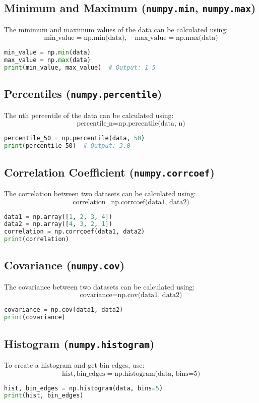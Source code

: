 \documentclass[a4paper, 12pt]{article}
\begin{document}
\subsection{ Minimum and Maximum (\texttt{numpy.min}, \texttt{numpy.max})}
The minimum and maximum values of the data can be calculated using:
\[
\text{min\_value} = \text{np.min(data)}, \quad \text{max\_value} = \text{np.max(data)}
\]
\begin{lstlisting}[language=Python]
min_value = np.min(data)
max_value = np.max(data)
print(min_value, max_value)  # Output: 1 5
\end{lstlisting}

\subsection{ Percentiles (\texttt{numpy.percentile})}
The nth percentile of the data can be calculated using:
\[
\text{percentile\_n} = \text{np.percentile(data, n)}
\]
\begin{lstlisting}[language=Python]
percentile_50 = np.percentile(data, 50)
print(percentile_50)  # Output: 3.0
\end{lstlisting}

\subsection{ Correlation Coefficient (\texttt{numpy.corrcoef})}
The correlation between two datasets can be calculated using:
\[
\text{correlation} = \text{np.corrcoef(data1, data2)}
\]
\begin{lstlisting}[language=Python]
data1 = np.array([1, 2, 3, 4])
data2 = np.array([4, 3, 2, 1])
correlation = np.corrcoef(data1, data2)
print(correlation)
\end{lstlisting}

\subsection{ Covariance (\texttt{numpy.cov})}
The covariance between two datasets can be calculated using:
\[
\text{covariance} = \text{np.cov(data1, data2)}
\]
\begin{lstlisting}[language=Python]
covariance = np.cov(data1, data2)
print(covariance)
\end{lstlisting}

\subsection{ Histogram (\texttt{numpy.histogram})}
To create a histogram and get bin edges, use:
\[
\text{hist}, \text{bin\_edges} = \text{np.histogram(data, bins=5)}
\]
\begin{lstlisting}[language=Python]
hist, bin_edges = np.histogram(data, bins=5)
print(hist, bin_edges)
\end{lstlisting}
\end{document}
